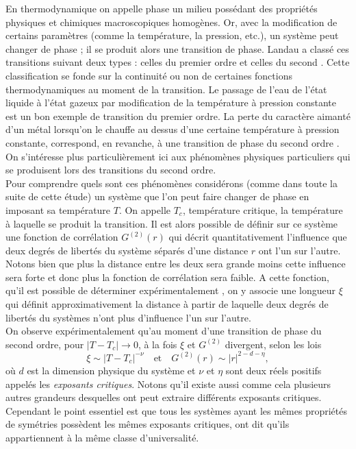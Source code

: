 \documentclass[10pt]{article}
\begin{document}
\begin{multicols}{2}
En thermodynamique on appelle phase un milieu possédant des propriétés physiques et chimiques macroscopiques homogènes. Or, avec la modification de certains paramètres (comme la température, la pression, etc.), un système peut changer de phase ; il se produit alors une transition de phase. Landau a classé ces transitions suivant deux types : celles du premier ordre et celles du second \cite{toledano1987landau}. Cette classification se fonde sur la continuité ou non de certaines fonctions thermodynamiques au moment de la transition. 
Le passage de l'eau de l'état liquide à l'état gazeux par modification de la température à pression constante est un bon exemple \cite{} de transition du premier ordre. La perte du caractère aimanté d'un métal lorsqu'on le chauffe au dessus d'une certaine température à pression constante, correspond, en revanche, à une transition de phase du second ordre \cite{kochmanski2013curie}. On s'intéresse plus particulièrement ici aux phénomènes physiques particuliers qui se produisent lors des transitions du second ordre. \\

Pour comprendre quels sont ces phénomènes considérons (comme dans toute la suite de cette étude) un système que l'on peut faire changer de phase en imposant sa température $T$. On appelle $T_c$, température critique, la température à laquelle se produit la transition. Il est alors possible de définir sur ce système une fonction de corrélation $G^{(2)}(r)$ qui décrit quantitativement l'influence que deux degrés de libertés du système séparés d'une distance $r$ ont l'un sur l'autre. Notons bien que plus la distance entre les deux sera grande moins cette influence sera forte et donc plus la fonction de corrélation sera faible. A cette fonction, qu'il est possible de déterminer expérimentalement \cite{Bellac2012}, on y associe une longueur $\xi$ qui définit approximativement la distance à partir de laquelle deux degrés de libertés du systèmes n'ont plus d'influence l'un sur l'autre.\\

On observe expérimentalement qu'au moment d'une transition de phase du second ordre, pour $|T-T_c| \rightarrow 0$, à la fois $\xi$ et $G^{(2)}$ divergent, selon les lois 
\begin{equation}
	\xi \sim |T-T_c|^{-\nu} 	\quad \text{et} \quad G^{(2)}(r) \sim |r|^{2-d-\eta},
\end{equation}
où $d$ est la dimension physique du système et $\nu$ et $\eta$ sont deux réels positifs appelés les \emph{exposants critiques}. Notons qu'il existe aussi comme cela plusieurs autres grandeurs desquelles ont peut extraire différents exposants critiques. Cependant le point essentiel est que tous les systèmes ayant les mêmes propriétés de symétries possèdent les mêmes exposants critiques, ont dit qu'ils appartiennent à la même classe d'universalité.\\



\end{multicols}
\end{document}
